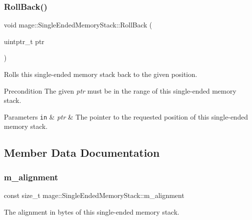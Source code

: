 \subsubsection{\texorpdfstring{Roll\+Back()}{RollBack()}}
{\footnotesize\ttfamily void mage\+::\+Single\+Ended\+Memory\+Stack\+::\+Roll\+Back (\begin{DoxyParamCaption}\item[{uintptr\+\_\+t}]{ptr }\end{DoxyParamCaption})\hspace{0.3cm}{\ttfamily [noexcept]}}

Rolls this single-\/ended memory stack back to the given position.

\begin{DoxyPrecond}{Precondition}
The given {\itshape ptr} must be in the range of this single-\/ended memory stack. 
\end{DoxyPrecond}

\begin{DoxyParams}[1]{Parameters}
\mbox{\tt in}  & {\em ptr} & The pointer to the requested position of this single-\/ended memory stack. \\
\hline
\end{DoxyParams}


\subsection{Member Data Documentation}
\mbox{\label{classmage_1_1_single_ended_memory_stack_aeb5bc5af575eaeb5a0f08669a717cd28}} 
\subsubsection{\texorpdfstring{m\+\_\+alignment}{m\_alignment}}
{\footnotesize\ttfamily const size\+\_\+t mage\+::\+Single\+Ended\+Memory\+Stack\+::m\+\_\+alignment\hspace{0.3cm}{\ttfamily [private]}}

The alignment in bytes of this single-\/ended memory stack. \mbox{\label{classmage_1_1_single_ended_memory_stack_a859a80ab120c14e3ebf4a310d5263507}} 
